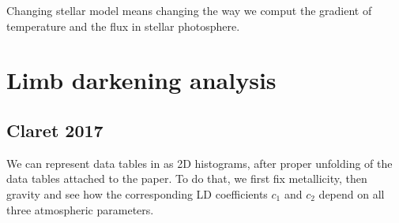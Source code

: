 \documentclass[a4paper,11pt,twocolumn]{article}
\begin{document}
Changing stellar model means changing the way we comput the gradient of temperature 
and the flux in stellar photosphere.









\nocite{*}
\printbibliography


\onecolumn

\appendix
\section{Limb darkening analysis}
\label{sect:app_A}

\subsection{Claret 2017}
We can represent data tables in \cite{claret2017} as 2D histograms, 
after proper unfolding of the data tables attached to the paper. To do that, 
we first fix metallicity, then gravity and see how the corresponding LD 
coefficients $c_1$ and $c_2$ depend on all three atmospheric parameters. 
\end{document}
